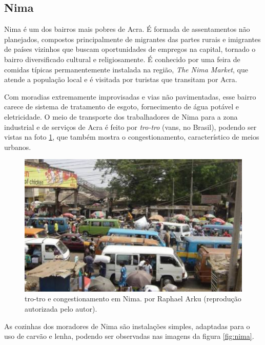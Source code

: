 \subsection{Nima}

Nima é um dos bairros mais pobres de Acra. É formada de assentamentos não 
planejados, compostos principalmente de migrantes das partes rurais e 
imigrantes de países vizinhos que buscam oportunidades de empregos na capital, 
tornado o bairro diversificado cultural e religiosamente. É conhecido por uma 
feira de comidas típicas permanentemente instalada na região,
\textit{The Nima Market}, que atende a população local e é visitada por turistas que 
transitam por Acra.

Com moradias extremamente improvisadas e vias não pavimentadas, esse bairro carece de 
sistema de tratamento de esgoto, fornecimento de água potável e eletricidade. 
O meio de transporte dos trabalhadores de Nima para a zona industrial e de 
serviços de Acra é feito por \textit{tro-tro} (vans, no Brasil), podendo ser vistas na foto 
\ref{fig:nima_tro}, que também mostra o congestionamento, característico de 
meios urbanos.  

\begin{figure}[H]
  \centering
    \includegraphics[width=0.5\linewidth]{../inputs/images/zheng/arku4.jpeg}
    \caption{tro-tro e congestionamento em Nima. por Raphael Arku 
           (reprodução autorizada pelo autor). \label{fig:nima_tro}}
\end{figure}

As cozinhas dos moradores de Nima são instalações simples, adaptadas para o uso
de carvão e lenha, podendo ser observadas nas imagens da figura \ref{fig:nima}.

